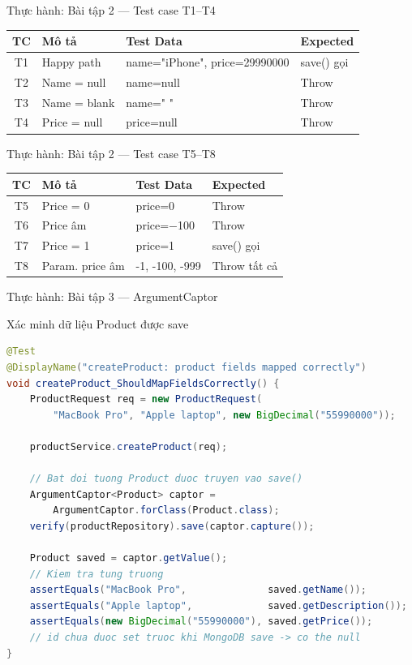 \documentclass[aspectratio=169,12pt]{beamer}
\begin{document}
\begin{frame}{Thực hành: Bài tập 2 --- Test case T1--T4}
  \large
  \renewcommand{\arraystretch}{1.28}
  \begin{tabularx}{\textwidth}{cXXX}
    \toprule
    \textbf{TC} & \textbf{Mô tả} & \textbf{Test Data} & \textbf{Expected} \\
    \midrule
    T1 & Happy path & name="iPhone", price=29990000 & save() gọi \\
    T2 & Name = null & name=null & Throw \\
    T3 & Name = blank & name="   " & Throw \\
    T4 & Price = null & price=null & Throw \\
    \bottomrule
  \end{tabularx}
  \renewcommand{\arraystretch}{1}
\end{frame}

\begin{frame}{Thực hành: Bài tập 2 --- Test case T5--T8}
  \large
  \renewcommand{\arraystretch}{1.28}
  \begin{tabularx}{\textwidth}{cXXX}
    \toprule
    \textbf{TC} & \textbf{Mô tả} & \textbf{Test Data} & \textbf{Expected} \\
    \midrule
    T5 & Price = 0 & price=0 & Throw \\
    T6 & Price âm & price=$-$100 & Throw \\
    T7 & Price = 1 & price=1 & save() gọi \\
    T8 & Param. price âm & -1, -100, -999 & Throw tất cả \\
    \bottomrule
  \end{tabularx}
  \renewcommand{\arraystretch}{1}
\end{frame}

\begin{frame}[fragile,shrink=12]{Thực hành: Bài tập 3 --- ArgumentCaptor}
  \begin{block}{Xác minh dữ liệu Product được save}
\begin{lstlisting}[language=java]
@Test
@DisplayName("createProduct: product fields mapped correctly")
void createProduct_ShouldMapFieldsCorrectly() {
    ProductRequest req = new ProductRequest(
        "MacBook Pro", "Apple laptop", new BigDecimal("55990000"));

    productService.createProduct(req);

    // Bat doi tuong Product duoc truyen vao save()
    ArgumentCaptor<Product> captor =
        ArgumentCaptor.forClass(Product.class);
    verify(productRepository).save(captor.capture());

    Product saved = captor.getValue();
    // Kiem tra tung truong
    assertEquals("MacBook Pro",              saved.getName());
    assertEquals("Apple laptop",             saved.getDescription());
    assertEquals(new BigDecimal("55990000"), saved.getPrice());
    // id chua duoc set truoc khi MongoDB save -> co the null
}
\end{lstlisting}
  \end{block}
\end{frame}
\end{document}
